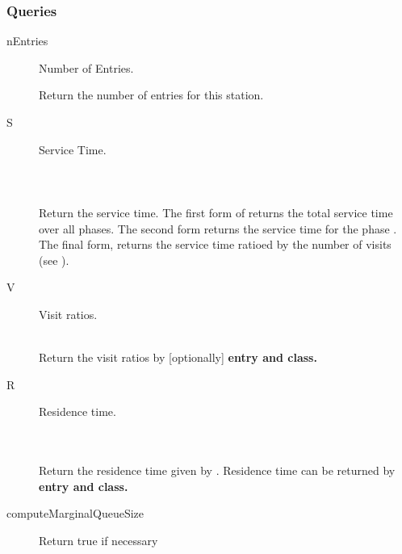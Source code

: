 \subsubsection{Queries}
\begin{description}
\item[nEntries] \texonly{---} Number of Entries.\\

  Return the number of entries for this station.

\item[S] \texonly{---} Service Time.\\
  \\
  \\
  \\

  Return the service time.  The first form of  returns the
  total service time over all phases.  The second form returns the
  service time for the phase .  The final form, 
  returns the service time ratioed by the number of visits (see
  ).

\item[V] \texonly{---} Visit ratios.\\
  \\

  Return the visit ratios by [optionally] \bf{entry} and \bf{class}.

\item[R] \texonly{---} Residence time.\\
  \\
  \\

  Return the residence time given by .  Residence time can be returned by \bf{entry} and
  \bf{class}.  

\item[computeMarginalQueueSize] \texonly{---} Return true if necessary\\


\end{description}
